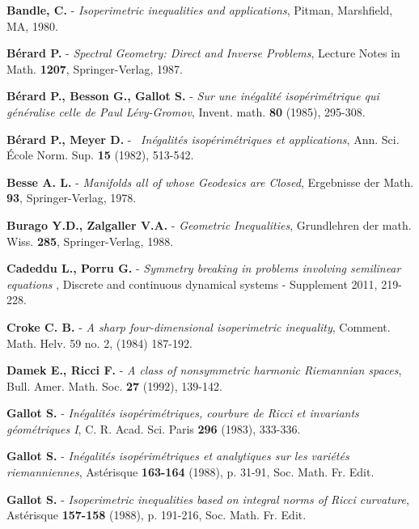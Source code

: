 \documentclass[11pt, reqno]{amsart}
\theoremstyle{plain}
\begin{document}
\begin{thebibliography}{10}

 \textbf{Bandle, C.} - \textit{Isoperimetric inequalities and applications},
Pitman, Marshfield, MA, 1980.

 \textbf{B\'{e}rard P.} - \textit{Spectral Geometry: Direct and Inverse Problems},
Lecture Notes in Math. {\bf 1207}, Springer-Verlag, 1987.

 \textbf{B\'{e}rard P., Besson G., Gallot S.} -  \textit{Sur une in\'{e}galit\'{e} isop\'{e}rim\'{e}trique
qui g\'{e}n\'{e}ralise celle de Paul L\'{e}vy-Gromov}, Invent. math. {\bf 80} (1985), 295-308.

 \textbf{B\'{e}rard P., Meyer D.} - \ \textit{In\'{e}galit\'{e}s isop\'{e}rim\'{e}triques et applications}, 
Ann. Sci. \'Ecole Norm. Sup. {\bf 15} (1982), 513-542.

 \textbf{Besse A. L.} - \textit{Manifolds all of whose Geodesics are Closed},
Ergebnisse der Math. {\bf 93}, Springer-Verlag, 1978.

 \textbf{Burago Y.D., 
Zalgaller V.A.} - \textit{Geometric Inequalities},
Grundlehren der math. Wiss. {\bf 285}, Springer-Verlag, 1988.

 \textbf{Cadeddu L., Porru G.} - \textit{Symmetry breaking in problems involving semilinear equations
}, Discrete and continuous dynamical systems - Supplement 2011, 219-228.
 
 \textbf{Croke C. B.} - \textit{A sharp four-dimensional isoperimetric inequality},
Comment. Math. Helv. 59  no. 2,  (1984) 187-192.

 \textbf{Damek E., Ricci F.} - \textit{A class of nonsymmetric harmonic Riemannian
spaces}, Bull. Amer. Math. Soc. {\bf 27} (1992), 139-142.

 \textbf{Gallot S.} - 
\textit{In\'{e}galit\'{e}s isop\'{e}rim\'{e}triques, courbure de Ricci et invariants g\'{e}om\'{e}triques I},
C. R. Acad. Sci. Paris {\bf 296} (1983), 333-336.

 \textbf{Gallot S.} - 
\textit{In\'{e}galit\'{e}s isop\'{e}rim\'{e}triques et analytiques sur les vari\'{e}t\'{e}s riemanniennes},
Ast\'{e}risque {\bf 163-164} (1988), p. 31-91,  Soc. Math. Fr. Edit.

 \textbf{Gallot S.} - 
\textit{Isoperimetric inequalities based on integral
norms of Ricci curvature},
Ast\'{e}risque {\bf 157-158} (1988), p. 191-216, Soc. Math. Fr. Edit.


\end{thebibliography}
\end{document}

